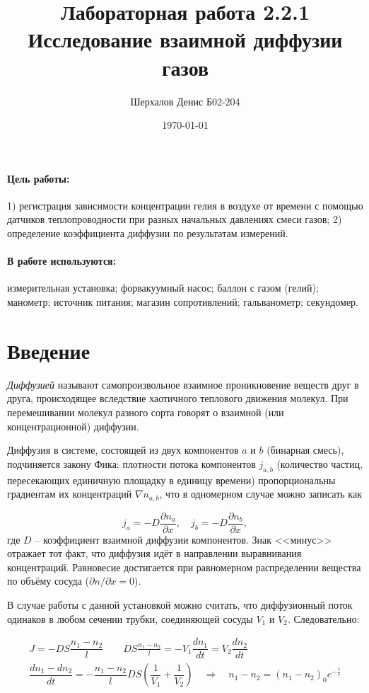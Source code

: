 \documentclass[a4paper,12pt]{article}
\author{Шерхалов Денис Б02-204}
\title{Лабораторная работа 2.2.1 \\
	\textbf{Исследование взаимной диффузии газов}}
\date{\today}
\theoremstyle{definition}
\begin{document}
	
	{\Large \maketitle}
	
	\paragraph*{Цель работы:} 1) регистрация зависимости концентрации гелия в воздухе от времени с помощью датчиков теплопроводности при разных начальных давлениях смеси газов; 2) определение коэффициента диффузии по результатам измерений.
	
	\paragraph*{В работе используются:} измерительная установка; форвакуумный насос; баллон с газом  (гелий); манометр; источник питания; магазин сопротивлений; гальванометр; секундомер.
	
	\section{Введение}
	
	\textit{Диффузией} называют самопроизвольное взаимное проникновение веществ друг в друга, происходящее вследствие хаотичного теплового движения молекул. При перемешивании молекул разного сорта говорят о взаимной (или концентрационной) диффузии.
	
	Диффузия в системе, состоящей из двух компонентов $ a $ и $ b $ (бинарная смесь), подчиняется закону Фика: плотности потока компонентов $ j_{a,b} $ (количество частиц, пересекающих единичную площадку в единицу времени) пропорциональны градиентам их концентраций $ \nabla n_{a,b}$, что в одномерном случае можно записать как
	
	\[ j_a = -D\dfrac{\partial n_a}{\partial x}, \quad j_b = -D\dfrac{\partial n_b}{\partial x}, \]
	где $ D $ -- коэффициент взаимной диффузии компонентов. Знак <<минус>> отражает тот факт, что диффузия идёт в направлении выравнивания концентраций. Равновесие достигается при равномерном распределении вещества по объёму сосуда ($ \partial n / \partial x = 0 $).
	
	В случае работы с данной установкой можно считать, что диффузионный поток одинаков в любом сечении трубки, соединяющей сосуды $V_1$ и $V_2$. Следовательно:
	
	\begin{align}
		J = -DS\dfrac{n_1-n_2}{l} \qquad DS\frac{n_1-n_2}{l} = -V_1\dfrac{dn_1}{dt} = V_2\dfrac{dn_2}{dt} \\
		\dfrac{dn_1 - dn_2}{dt} = -\dfrac{n_1-n_2}{l}DS\left(\dfrac{1}{V_1}+\dfrac{1}{V_2}\right) \quad\Rightarrow\quad n_1-n_2 = (n_1-n_2)_0 e^{-\frac{t}{\tau}}
	\end{align}
	
\end{document}
